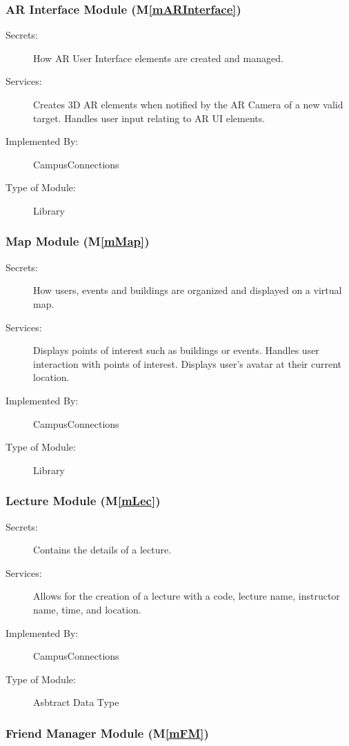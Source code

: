 \documentclass[12pt, titlepage]{article}
\newcommand{\mref}[1]{M\ref{#1}}
\begin{document}
\subsubsection{AR Interface Module (\mref{mARInterface})}
\begin{description}
\item[Secrets:]How AR User Interface elements are created and managed.
\item[Services:]Creates 3D AR elements when notified by the AR Camera of a new valid target. Handles user input relating to AR UI elements.
\item[Implemented By:] CampusConnections
\item[Type of Module:] Library
\end{description}

\subsubsection{Map Module (\mref{mMap})}
\begin{description}
\item[Secrets:]How users, events and buildings are organized and displayed on a virtual map.
\item[Services:]Displays points of interest such as buildings or events. Handles user interaction with points of interest. Displays user's avatar at their current location.
\item[Implemented By:] CampusConnections
\item[Type of Module:] Library
\end{description}

\subsubsection{Lecture Module (\mref{mLec})}

\begin{description}
\item[Secrets:] Contains the details of a lecture.
\item[Services:] Allows for the creation of a lecture with a code, lecture name, instructor name, time, and location.
\item[Implemented By:] CampusConnections
\item[Type of Module:] Asbtract Data Type
\end{description}

\subsubsection{Friend Manager Module (\mref{mFM})}
\end{document}
